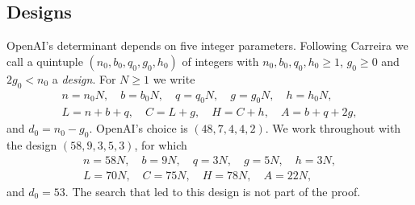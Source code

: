 \documentclass[11pt]{amsart}
\theoremstyle{definition}
\theoremstyle{remark}
\numberwithin{equation}{section}
\begin{document}
\subsection{Designs}
OpenAI's determinant depends on five integer parameters. Following Carreira \cite{Carreira2026} we call a
quintuple $(n_0,b_0,q_0,g_0,h_0)$ of integers with $n_0,b_0,q_0,h_0\ge1$, $g_0\ge0$ and $2g_0<n_0$ a
\emph{design}. For $N\ge1$ we write
\begin{gather*}
 n=n_0N,\quad b=b_0N,\quad q=q_0N,\quad g=g_0N,\quad h=h_0N,\\
 L=n+b+q,\quad C=L+g,\quad H=C+h,\quad A=b+q+2g ,
\end{gather*}
and $d_0=n_0-g_0$. OpenAI's choice is $(48,7,4,4,2)$. We work throughout with the design $(58,9,3,5,3)$,
for which
\begin{gather*}
 n=58N,\quad b=9N,\quad q=3N,\quad g=5N,\quad h=3N,\\
 L=70N,\quad C=75N,\quad H=78N,\quad A=22N,
\end{gather*}
and $d_0=53$. The search that led to this design is not part of the proof.
\end{document}
